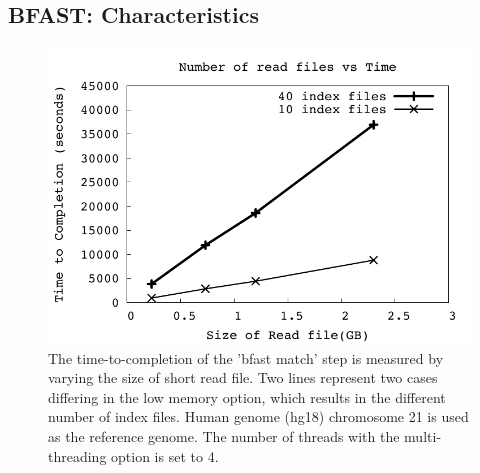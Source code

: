 \documentclass{acm_proc_article-sp}
\begin{document}
\subsection{BFAST: Characteristics}


\begin{figure}
 \centering
\includegraphics[scale=0.66]{figures/readsvstime.pdf}

\caption{\small The time-to-completion of the 'bfast match' step is
  measured by varying the size of short read file.  Two lines
  represent two cases differing in the low memory option, which
  results in the different number of index files.  Human genome (hg18)
  chromosome 21 is used as the reference genome. The number of threads with the multi-threading option is set to 4.}
  \label{fig:parallel-execution} 
 \end{figure}
\end{document}
